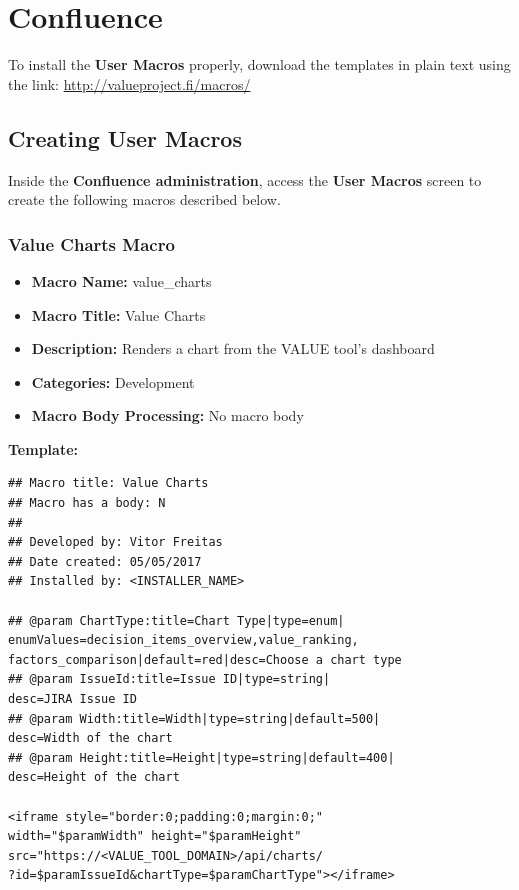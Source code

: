 \documentclass{article}
\begin{document}
\section{Confluence}
\label{confluence}

To install the \textbf{User Macros} properly, download the templates in plain text using the link: \url{http://valueproject.fi/macros/}

\subsection{Creating User Macros}
Inside the \textbf{Confluence administration}, access the \textbf{User Macros} screen to create the following macros described below.

\subsubsection{Value Charts Macro}

\begin{itemize}
    \item \textbf{Macro Name:} value\_charts
    \item \textbf{Macro Title:} Value Charts
    \item \textbf{Description:} Renders a chart from the VALUE tool's dashboard
    \item \textbf{Categories:} Development
    \item \textbf{Macro Body Processing:} No macro body
\end{itemize}

\textbf{Template:}

\begin{lstlisting}[frame=single]
## Macro title: Value Charts
## Macro has a body: N
##
## Developed by: Vitor Freitas
## Date created: 05/05/2017
## Installed by: <INSTALLER_NAME>

## @param ChartType:title=Chart Type|type=enum|
enumValues=decision_items_overview,value_ranking,
factors_comparison|default=red|desc=Choose a chart type
## @param IssueId:title=Issue ID|type=string|
desc=JIRA Issue ID
## @param Width:title=Width|type=string|default=500|
desc=Width of the chart
## @param Height:title=Height|type=string|default=400|
desc=Height of the chart

<iframe style="border:0;padding:0;margin:0;" 
width="$paramWidth" height="$paramHeight" 
src="https://<VALUE_TOOL_DOMAIN>/api/charts/
?id=$paramIssueId&chartType=$paramChartType"></iframe>
\end{lstlisting}
\end{document}
